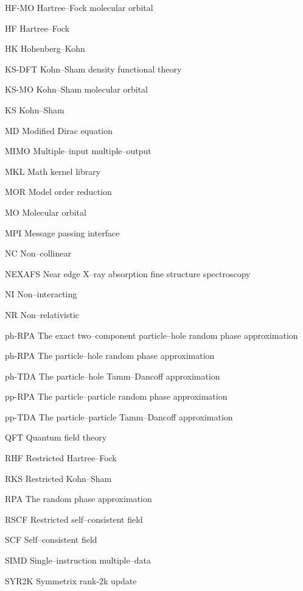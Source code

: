 \begin{glossary}
  \item[HF-MO]       Hartree--Fock   molecular orbital
  \item[HF]          Hartree--Fock
  \item[HK]          Hohenberg--Kohn
  \item[KS-DFT]      Kohn--Sham density functional theory
  \item[KS-MO]       Kohn--Sham   molecular orbital
  \item[KS]          Kohn--Sham
  \item[MD]          Modified Dirac equation
  \item[MIMO]        Multiple--input multiple--output
  \item[MKL]         Math kernel library
  \item[MOR]         Model order reduction
  \item[MO]          Molecular orbital
  \item[MPI]         Message passing interface
  \item[NC]          Non--collinear
  \item[NEXAFS]      Near edge X--ray absorption fine structure spectroscopy
  \item[NI]          Non--interacting
  \item[NR]          Non--relativistic
  \item[ph-RPA]      The exact two--component particle--hole random phase approximation
  \item[ph-RPA]      The particle--hole random phase approximation
  \item[ph-TDA]      The particle--hole Tamm--Dancoff approximation
  \item[pp-RPA]      The particle--particle random phase approximation
  \item[pp-TDA]      The particle--particle Tamm--Dancoff approximation
  \item[QFT]         Quantum field theory
  \item[RHF]         Restricted Hartree--Fock
  \item[RKS]         Restricted Kohn--Sham
  \item[RPA]         The random phase approximation
  \item[RSCF]        Restricted self--consistent field
  \item[SCF]         Self--consistent field
  \item[SIMD]        Single--instruction multiple--data
  \item[SYR2K]       Symmetrix rank-2k update

\end{glossary}
